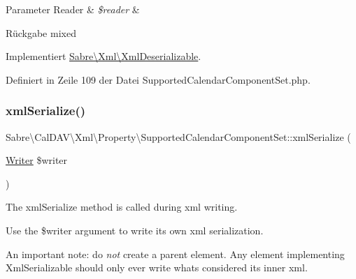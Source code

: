 \begin{DoxyParams}[1]{Parameter}
Reader & {\em \$reader} & \\
\hline
\end{DoxyParams}
\begin{DoxyReturn}{Rückgabe}
mixed 
\end{DoxyReturn}


Implementiert \mbox{\hyperlink{interface_sabre_1_1_xml_1_1_xml_deserializable_a19e0eca545b9a0d93f7d6b69085ade30}{Sabre\textbackslash{}\+Xml\textbackslash{}\+Xml\+Deserializable}}.



Definiert in Zeile 109 der Datei Supported\+Calendar\+Component\+Set.\+php.

\mbox{\label{class_sabre_1_1_cal_d_a_v_1_1_xml_1_1_property_1_1_supported_calendar_component_set_ae645b231b50c4ffb0e64b690843caa91}} 
\subsubsection{\texorpdfstring{xml\+Serialize()}{xmlSerialize()}}
{\footnotesize\ttfamily Sabre\textbackslash{}\+Cal\+D\+A\+V\textbackslash{}\+Xml\textbackslash{}\+Property\textbackslash{}\+Supported\+Calendar\+Component\+Set\+::xml\+Serialize (\begin{DoxyParamCaption}\item[{\mbox{\hyperlink{class_sabre_1_1_xml_1_1_writer}{Writer}}}]{\$writer }\end{DoxyParamCaption})}

The xml\+Serialize method is called during xml writing.

Use the \$writer argument to write its own xml serialization.

An important note\+: do {\itshape not} create a parent element. Any element implementing Xml\+Serializable should only ever write what\textquotesingle{}s considered its \textquotesingle{}inner xml\textquotesingle{}.

